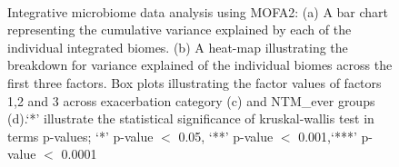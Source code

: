 \begin{figure}[h]
	\centering
	\\
	\caption{Integrative microbiome data analysis using MOFA2: (a) A bar chart representing the cumulative variance explained by each of the individual integrated biomes. (b) A heat-map illustrating the breakdown for variance explained of the individual biomes across the first three factors. Box plots illustrating the factor values of factors 1,2 and 3 across exacerbation category (c) and NTM\_ever groups (d).`*' illustrate the statistical significance of kruskal-wallis test in terms p-values; `*' p-value $<$ 0.05, `**' p-value $<$ 0.001,`***' p-value $<$ 0.0001}
	\label{res2_fig3}
\end{figure}

